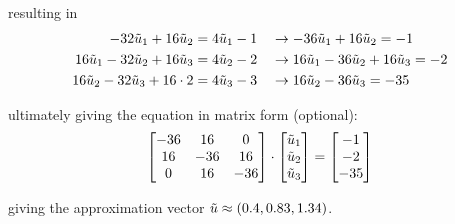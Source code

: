 resulting in
\begin{align*}
	-32\tilde{u}_1 + 16\tilde{u}_2 & = 4\tilde{u}_1 - 1\quad\rightarrow -36\tilde{u}_1 + 16\tilde{u}_2 = -1 \\
	16\tilde{u}_1 - 32\tilde{u}_2 + 16\tilde{u}_3 & = 4\tilde{u}_2 - 2\quad\rightarrow 16\tilde{u}_1 - 36\tilde{u}_2 + 16\tilde{u}_3 = -2 \\
	16\tilde{u}_2 - 32\tilde{u}_3 + 16\cdot 2 & = 4\tilde{u}_3 - 3\quad\rightarrow 16\tilde{u}_2 - 36\tilde{u}_3 = -35
\end{align*}

ultimately giving the equation in matrix form (optional):
\begin{align*}
	\begin{bmatrix}
		-36 & 16 & 0 \\
		16 & -36 & 16 \\
		0 & 16 & -36
	\end{bmatrix}
	\cdot
	\begin{bmatrix}
		\tilde{u}_1 \\
		\tilde{u}_2 \\
		\tilde{u}_3 \\
	\end{bmatrix}
	=
	\begin{bmatrix}
		-1 \\
		-2 \\
		-35
	\end{bmatrix}
\end{align*}

giving the approximation vector $\tilde{u} \approx (0.4, 0.83, 1.34)$.